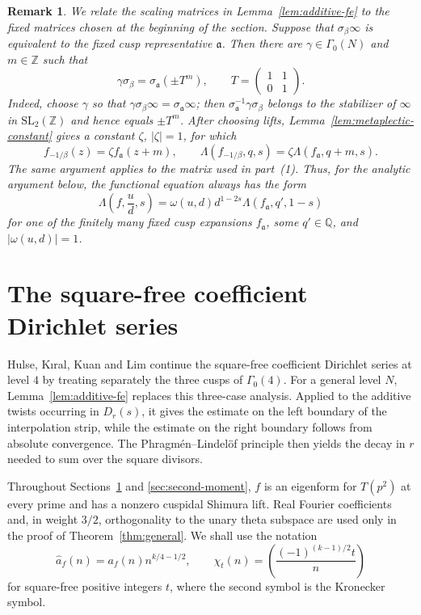 \documentclass[10pt,a4paper]{amsart}
\newtheorem{remark}[theorem]{Remark}
\newcommand{\Q}{\mathbb Q}
\newcommand{\Z}{\mathbb Z}
\begin{document}
\begin{remark}\label{rem:structural-fe}
We relate the scaling matrices in Lemma~\ref{lem:additive-fe} to the fixed
matrices chosen at the beginning of the section. Suppose that
$\sigma_\beta\infty$ is equivalent to the fixed cusp representative
$\mathfrak a$. Then there are $\gamma\in\Gamma_0(N)$ and $m\in\Z$ such
that
\[
\gamma\sigma_\beta=\sigma_{\mathfrak a}(\pm T^m),
\qquad
T=\begin{pmatrix}1&1\\0&1\end{pmatrix}.
\]
Indeed, choose $\gamma$ so that
$\gamma\sigma_\beta\infty=\sigma_{\mathfrak a}\infty$; then
$\sigma_{\mathfrak a}^{-1}\gamma\sigma_\beta$ belongs to the stabilizer
of $\infty$ in $\mathrm{SL}_2(\Z)$ and hence equals $\pm T^m$. After
choosing lifts, Lemma~\ref{lem:metaplectic-constant} gives a constant
$\zeta$, $|\zeta|=1$, for which
\[
f_{-1/\beta}(z)=\zeta f_{\mathfrak a}(z+m),
\qquad
\Lambda(f_{-1/\beta},q,s)
 =\zeta\Lambda(f_{\mathfrak a},q+m,s).
\]
The same argument applies to the matrix used in part~\textup{(1)}. Thus,
for the analytic argument below, the functional equation always has the
form
\[
\Lambda\left(f,\frac ud,s\right)
=\omega(u,d)d^{1-2s}\Lambda(f_{\mathfrak a},q',1-s)
\]
for one of the finitely many fixed cusp expansions $f_{\mathfrak a}$,
some $q'\in\Q$, and $|\omega(u,d)|=1$.
\end{remark}

\section{The square-free coefficient Dirichlet series}\label{sec:squarefree-series}

Hulse, K{\i}ral, Kuan and Lim continue the square-free coefficient
Dirichlet series at level $4$ by treating separately the three cusps of
$\Gamma_0(4)$. For a general level $N$, Lemma~\ref{lem:additive-fe}
replaces this three-case analysis. Applied to the additive twists occurring
in $D_r(s)$, it gives the estimate on the left boundary of the interpolation
strip, while the estimate on the right boundary follows from absolute
convergence. The Phragm\'en--Lindel\"of principle then yields the decay in
$r$ needed to sum over the square divisors.

Throughout Sections~\ref{sec:squarefree-series} and
\ref{sec:second-moment}, $f$ is an eigenform for $T(p^2)$ at every prime
and has a nonzero cuspidal Shimura lift. Real Fourier coefficients and, in
weight $3/2$, orthogonality to the unary theta subspace are used only in
the proof of Theorem~\ref{thm:general}. We shall use the notation
\[
\widehat a_f(n)=a_f(n)n^{k/4-1/2},
\qquad
\chi_t(n)=\left(\frac{(-1)^{(k-1)/2}t}{n}\right)
\]
for square-free positive integers $t$, where the second symbol is the
Kronecker symbol.
\end{document}
